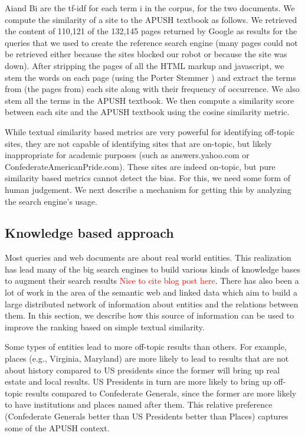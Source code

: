 \documentclass{acm_proc_article-sp}
\begin{document}
Aiand Bi are the tf-idf for each term i in the corpus, for the two documents. We
compute the similarity of a site to the APUSH textbook as follows. We retrieved
the content of 110,121 of the 132,145 pages returned by Google as results for
the queries that we used to create the reference search engine (many pages could
not be retrieved either because the sites blocked our robot or because the site
was down). After stripping the pages of all the HTML markup and javascript, we
stem the words on each page (using the Porter Stemmer
\cite{porter1980algorithm}) and extract the terms from (the pages from) each
site along with their frequency of occurrence. We also stem all the terms in the
APUSH textbook. We then compute a similarity score between each site and the
APUSH textbook using the cosine similarity metric.

While textual similarity based metrics are very powerful for identifying
off-topic sites, they are not capable of identifying sites that are on-topic,
but likely inappropriate for academic purposes (such as answers.yahoo.com or
ConfederateAmericanPride.com). These sites are indeed on-topic, but pure
similarity based metrics cannot detect the bias. For this, we need some form of
human judgement. We next describe a mechanism for getting this by analyzing the
search engine's usage. 

\subsection{Knowledge based approach}

Most queries and web documents are about real world entities.  This realization
has lead many of the big search engines to build various kinds of knowledge
bases to augment their search results \textcolor{red}{Nice to cite blog post
  here}. There has also been a lot of work in the area of the semantic web
and linked data \cite{berners2001semantic,bizer2008linked} which aim to build a
large distributed network of information about entities and the relations
between them. In this section, we describe how this source of information can be
used to improve the ranking based on simple textual similarity.  

Some types of entities lead to more off-topic results than others. For example,
places (e.g., Virginia, Maryland) are more likely to lead to results that are
not about history compared to US presidents since the former will bring up real
estate and local results. US Presidents in turn are more likely to bring up
off-topic results compared to Confederate Generals, since the former are more
likely to have institutions and places named after them. This relative preference
(Confederate Generals better than US Presidents better than Places) captures
some of the APUSH context. 
\end{document}

